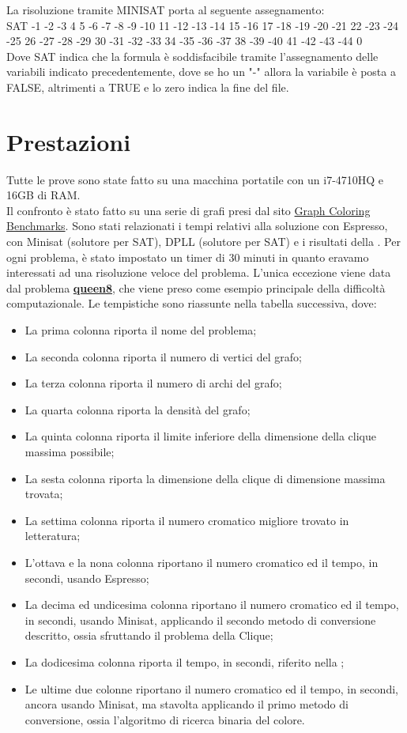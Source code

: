 \documentclass[a4paper,11pt]{article} %
\begin{document}
La risoluzione tramite MINISAT porta al seguente assegnamento:\\
SAT
-1 -2 -3 4 5 -6 -7 -8 -9 -10 11 -12 -13 -14 15 -16 17 -18 -19 -20 -21 22 -23 -24 -25 26 -27 -28 -29 30 -31 -32 -33 34 -35 -36 -37 38 -39 -40 41 -42 -43 -44 0\\
Dove SAT indica che la formula è soddisfacibile tramite l'assegnamento delle variabili indicato precedentemente, dove se ho un "-" allora la variabile è posta a FALSE, altrimenti a TRUE e lo zero indica la fine del file.

\pagebreak

\section{Prestazioni}
Tutte le prove sono state fatto su una macchina portatile con un i7-4710HQ e 16GB di RAM.\\
Il confronto è stato fatto su una serie di grafi presi dal sito \href{https://sites.google.com/site/graphcoloring/vertex-coloring}{Graph Coloring Benchmarks}. Sono stati relazionati i tempi relativi alla soluzione con Espresso, con Minisat \cite{minisat} (solutore per SAT), DPLL \cite{dpll}(solutore per SAT) e i risultati della \cite{tesi}.
Per ogni problema, è stato impostato un timer di 30 minuti in quanto eravamo interessati ad una risoluzione veloce del problema. L'unica eccezione viene data dal problema \href{https://it.wikipedia.org/wiki/Rompicapo_delle_otto_regine}{\textbf{queen8}}, che viene preso come esempio principale della difficoltà computazionale.
Le tempistiche sono riassunte nella tabella successiva, dove:
\begin{itemize}
	\item La prima colonna riporta il nome del problema;
	\item La seconda colonna riporta il numero di vertici del grafo;
	\item La terza colonna riporta il numero di archi del grafo;
	\item La quarta colonna riporta la densità del grafo;
	\item La quinta colonna riporta il limite inferiore della dimensione della clique massima possibile;
	\item La sesta colonna riporta la dimensione della clique di dimensione massima trovata;
	\item La settima colonna riporta il numero cromatico migliore trovato in letteratura;
	\item L'ottava e la nona colonna riportano il numero cromatico ed il tempo, in secondi, usando Espresso;
	\item La decima ed undicesima colonna riportano il numero cromatico ed il tempo, in secondi, usando Minisat, applicando il secondo metodo di conversione descritto, ossia sfruttando il problema della Clique;
	\item La dodicesima colonna riporta il tempo, in secondi, riferito nella \cite{tesi};
	\item Le ultime due colonne riportano il numero cromatico ed il tempo, in secondi, ancora usando Minisat, ma stavolta applicando il primo metodo di conversione, ossia l'algoritmo di ricerca binaria del colore.
\end{itemize}
\end{document}
